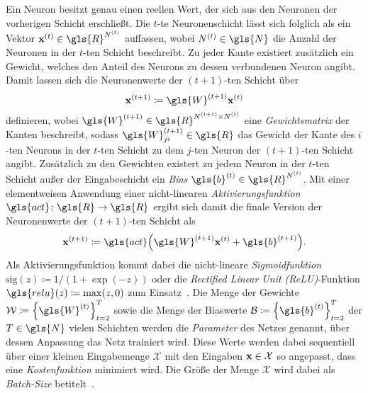 Ein Neuron besitzt genau einen reellen Wert, der sich aus den Neuronen der vorherigen Schicht erschließt.
Die $t$-te Neuronenschicht lässt sich folglich als ein Vektor $\ve{x}^{\left(t\right)} \in \gls{R}^{N^{\left(t\right)}}$ auffassen, wobei $N^{\left(t\right)} \in \gls{N}$ die Anzahl der Neuronen in der $t$-ten Schicht beschreibt.
Zu jeder Kante existiert zusätzlich ein Gewicht, welches den Anteil des Neurons zu dessen verbundenen Neuron angibt.
Damit lassen sich die Neuronenwerte der $\left(t+1\right)$-ten Schicht über
\begin{equation*}
  \ve{x}^{\left(t+1\right)} \coloneqq \gls{W}^{\left(t+1\right)}\ve{x}^{\left(t\right)}
\end{equation*}
definieren, wobei $\gls{W}^{\left(t+1\right)} \in \gls{R}^{N^{\left(t+1\right)} \times N^{\left(t\right)}}$ eine \emph{Gewichtsmatrix} der Kanten beschreibt, sodass $\gls{W}^{\left(t+1\right)}_{ji} \in \gls{R}$ das Gewicht der Kante des $i$-ten Neurons in der $t$-ten Schicht zu dem $j$-ten Neuron der $\left(t+1\right)$-ten Schicht angibt.
Zusätzlich zu den Gewichten existert zu jedem Neuron in der $t$-ten Schicht außer der Eingabeschicht ein \emph{Bias} $\gls{b}^{\left(t\right)} \in \gls{R}^{N^{\left(t\right)}}$.
Mit einer elementweisen Anwendung einer nicht-linearen \emph{Aktivierungsfunktion} $\gls{act} \colon \gls{R} \to \gls{R}$ ergibt sich damit die finale Version der Neuronenwerte der $\left(t+1\right)$-ten Schicht als
\begin{equation*}
  \ve{x}^{\left(t+1\right)} \coloneqq \gls{act} \left(\gls{W}^{\left(t+1\right)}\ve{x}^{\left(t\right)} + \gls{b}^{\left(t+1\right)} \right).
\end{equation*}
Als Aktivierungsfunktion kommt dabei \bspw{} die nicht-lineare \emph{Sigmoidfunktion} $\mathrm{sig}\left(z\right) \coloneqq 1 / \left(1 + \exp\left(-z\right)\right)$ oder die \emph{Rectified Linear Unit (ReLU)}-Funktion $\gls{relu}\left(z\right) \coloneqq \max \left(z, 0\right)$ zum Einsatz~\cite{Nielsen}.
Die Menge der Gewichte $\mathcal{W} \coloneqq {\left\{\gls{W}^{\left(t\right)}\right\}}_{t=2}^T$ sowie die Menge der Biaswerte $\mathcal{B} \coloneqq {\left\{\gls{b}^{\left(t\right)}\right\}}_{t=2}^T$ der $T \in \gls{N}$ vielen Schichten werden die \emph{Parameter} des Netzes genannt, über dessen Anpassung das Netz trainiert wird.
Diese Werte werden dabei sequentiell über einer kleinen Eingabemenge $\mathcal{X}$ mit den Eingaben $\mathbf{x} \in \mathcal{X}$ so angepasst, dass eine \emph{Kostenfunktion} minimiert wird.
Die Größe der Menge $\mathcal{X}$ wird dabei als \emph{Batch-Size} betitelt~\cite{Nielsen}.
